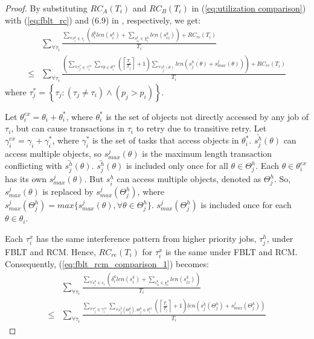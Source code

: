 \documentclass[a4paper,english]{article}
\newtheorem{proof}{Proof}
\begin{document}
\begin{proof}\normalfont
By substituting $RC_{A}(T_{i})$ and $RC_{B}(T_{i})$ in (\ref{eq:utilization comparison})
with (\ref{eq:fblt_rc}) and (6.9) in \cite{shambake_phd_proposal}, respectively, we get:
\begin{eqnarray}
 & \sum_{\forall\tau_{i}}\frac{\sum_{\forall s_{i}^{k}\in s_{i}}\left(\delta_i^klen(s_{i}^{k})+\sum_{s_{iz}^k\in \chi_i^k} len(s_{iz}^{k})\right)+RC_{re}(T_{i})}{T_{i}}\label{eq:fblt_rcm_comparison_1}\\
\le & \sum_{\forall\tau_{i}}\frac{\left(\sum_{\forall\tau_{j}^{*}\in\gamma_{i}^{ex}}\sum_{\forall\theta\in\theta_{i}^{ex}}\left(\left\lceil \frac{T_{i}}{T_{j}}\right\rceil +1\right)\sum_{\forall\bar{s_{j}^{h}(\theta)}}len\left(\bar{s_{j}^{h}(\theta)}+s_{max}^{j}(\theta)\right)\right)+RC_{re}(T_{i})}{T_{i}}\nonumber 
\end{eqnarray}
where $\tau_{j}^{*}=\left\{ \tau_{j}:\left(\tau_{j}\ne\tau_{i}\right)\wedge\left(p_{j}>p_{i}\right)\right\} $.


Let $\theta_{i}^{ex}=\theta_{i}+\theta_{i}^{*}$, where $\theta_{i}^{*}$
is the set of objects not directly accessed by any job of $\tau_{i}$, but can cause transactions in $\tau_{i}$ to retry due to transitive retry.
%
Let $\gamma_{i}^{ex}=\gamma_{i}+\gamma_{i}^{*}$, where $\gamma_{i}^{*}$
is the set of tasks that access objects in $\theta_{i}^{*}$. $\bar{s_{j}^{h}}(\theta)$
can access multiple objects, so $s_{max}^{j}(\theta)$ is the maximum
length transaction conflicting with $\bar{s_{j}^{h}}(\theta)$. $\bar{s_{j}^{h}}(\theta)$ is included only once for all $\theta \in \Theta_j^h$. Each $\theta \in \theta_i^{ex}$ has its own $s_{max}^j(\theta)$. But $s_i^h$ can access multiple objects, denoted as $\Theta_j^h$. So, $s_{max}^j(\theta)$ is replaced by $s_{max}^j(\Theta_j^h)$, where $s_{max}^j(\Theta_j^h)=max\{s_{max}^j(\theta),\forall \theta \in \Theta_j^h\}$. $s_{max}^j(\Theta_j^h)$ is included once for each $\theta \in \theta_i$. 


Each $\tau_i^x$ has the same interference pattern from higher priority jobs, $\tau_j^h$, under FBLT and RCM. Hence, $RC_{re}(T_i)$ for $\tau_i^x$ is the same under FBLT and RCM. Consequently, (\ref{eq:fblt_rcm_comparison_1}) becomes:
\begin{eqnarray}
 & \sum_{\forall\tau_{i}}\frac{\sum_{\forall s_{i}^{k}\in s_{i}}\left(\delta_i^klen(s_{i}^{k})+\sum_{s_{iz}^k\in \chi_i^k} len(s_{iz}^{k})\right)}{T_{i}}\label{eq:fblt_rcm_comparison_2}\\
\le & \sum_{\forall\tau_{i}}\frac{\sum_{\forall\tau_{j}^{*}\in\gamma_{i}^{ex}}\sum_{\forall \bar{s_j^h}(\Theta_j^h),\Theta_j^h \in\theta_{i}^{ex}}\left(\left\lceil \frac{T_{i}}{T_{j}}\right\rceil +1\right)len\left(\bar{s_{j}^{h}}(\Theta_j^h)+s_{max}^{j}(\Theta_j^h)\right)}{T_{i}}\nonumber 
\end{eqnarray}



\end{proof}
\end{document}
